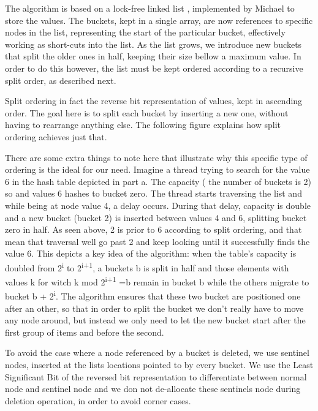 The algorithm is based on a lock-free linked list , implemented by Michael \cite{lock_free_list} to store the values. The buckets, kept in a single array, are now references to specific nodes in the list, representing the start of the particular bucket, effectively working as short-cuts into the list. As the list grows, we introduce new buckets that split the older ones in half, keeping their size bellow a maximum value. In order to do this however, the list must be kept ordered according to a recursive split order, as described next.

Split ordering in fact the reverse bit representation of values, kept in ascending order. The goal here is to split each bucket by inserting a new one, without having to rearrange anything else. The following figure explains how split ordering achieves just that.


There are some extra things to note here that illustrate why this specific type of ordering is the ideal for our need. Imagine a thread trying to search for the value 6 in the hash table depicted in part a. The capacity ( the number of buckets is 2) so and values 6 hashes to bucket zero. The thread starts traversing the list and while being at node value 4, a delay occurs. During that delay, capacity is double and a new bucket (bucket 2) is inserted between values 4 and 6, splitting bucket zero in half. As seen above, 2 is prior to 6 according to split ordering, and that mean that traversal well go past 2 and keep looking until it successfully finds the value 6. This depicts a key idea of the algorithm: when the table's capacity is doubled from 2\textsuperscript{i} to 2\textsuperscript{i+1}, a buckets b is split in half and those elements with values k for witch k mod 2\textsuperscript{i+1} =b  remain in bucket b while the others migrate to bucket b + 2\textsuperscript{i}. The algorithm ensures that these two bucket are positioned one after an other, so that in order to split the bucket we don’t really have to move any node around, but instead we only need to let the new bucket start after the first group of items and before the second.

To avoid the case where a node referenced by a bucket is deleted, we use sentinel nodes, inserted at the lists locations pointed to by every bucket. We use the Least Significant Bit of the reversed bit representation to differentiate between normal node and sentinel node and we don not de-allocate these sentinels node during deletion operation, in order to avoid corner cases.

